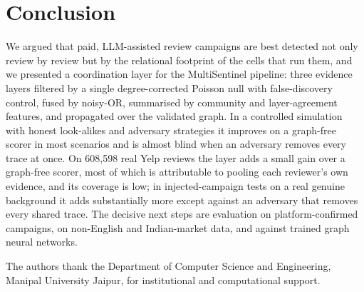 \documentclass[pdflatex,sn-basic]{sn-jnl}
\theoremstyle{thmstyleone}
\theoremstyle{thmstylethree}
\begin{document}
\section{Conclusion}\label{sec:concl}
We argued that paid, LLM-assisted review campaigns are best detected not only review by review but by the relational footprint of the cells that run them, and we presented a coordination layer for the MultiSentinel pipeline: three evidence layers filtered by a single degree-corrected Poisson null with false-discovery control, fused by noisy-OR, summarised by community and layer-agreement features, and propagated over the validated graph. In a controlled simulation with honest look-alikes and adversary strategies it improves on a graph-free scorer in most scenarios and is almost blind when an adversary removes every trace at once. On 608{,}598 real Yelp reviews the layer adds a small gain over a graph-free scorer, most of which is attributable to pooling each reviewer's own evidence, and its coverage is low; in injected-campaign tests on a real genuine background it adds substantially more except against an adversary that removes every shared trace. The decisive next steps are evaluation on platform-confirmed campaigns, on non-English and Indian-market data, and against trained graph neural networks.

\backmatter

The authors thank the Department of Computer Science and Engineering, Manipal University Jaipur, for institutional and computational support.
\end{document}
